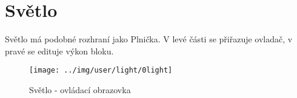 
\section{Světlo}

Světlo má podobné rozhraní jako Plnička. V levé části se přiřazuje ovladač, v pravé se edituje výkon bloku.

\begin{figure}[!h]\centering
\texttt{[image: ../img/user/light/0light]}

\caption{Světlo - ovládací obrazovka}
\label{fig:user_light_0light}

\end{figure}

\FloatBarrier
